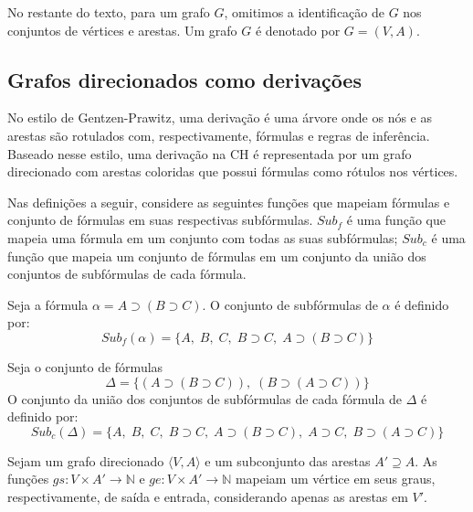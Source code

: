 No restante do texto, para um grafo $G$, omitimos a identificação de $G$ nos conjuntos de vértices e arestas. Um grafo $G$ é denotado por $G = (V, A)$. 

\subsection{Grafos direcionados como derivações}

No estilo de Gentzen-Prawitz, uma derivação é uma árvore onde os nós e as arestas são rotulados com, respectivamente, fórmulas e regras de inferência. Baseado nesse estilo, uma derivação na CH é representada por um grafo direcionado com arestas coloridas que possui fórmulas como  rótulos nos vértices.

Nas definições a seguir, considere as seguintes funções que mapeiam fórmulas e conjunto de fórmulas em suas respectivas subfórmulas. $Sub_f$ é uma função que mapeia uma fórmula em um conjunto com todas as suas subfórmulas; $Sub_c$ é uma função que mapeia um conjunto de fórmulas em um conjunto da união dos conjuntos de subfórmulas de cada fórmula.

\begin{example}
Seja a fórmula $\alpha = A \supset (B \supset C)$. O conjunto de subfórmulas de $\alpha$ é definido por: $$Sub_f(\alpha) = \{A,\; B,\; C,\; B\supset C,\; A \supset (B \supset C)\}$$
\end{example}

\begin{example}
Seja o conjunto de fórmulas $$\Delta = \{(A \supset (B \supset C)),\; (B \supset (A \supset C))\}$$ O conjunto da união dos conjuntos de subfórmulas de cada fórmula de $\Delta$ é definido por: $$Sub_c(\Delta) = \{A,\; B,\; C,\; B\supset C,\; A \supset (B \supset C),\; A \supset C,\; B \supset (A \supset C)\}$$
\end{example}

Sejam um grafo direcionado $\langle V, A\rangle$ e um subconjunto das arestas $A' \supseteq A$. As funções $gs: V \times A' \rightarrow \mathbb{N}$ e $ge: V \times A' \rightarrow \mathbb{N}$ mapeiam um vértice em seus graus, respectivamente, de saída e entrada, considerando apenas as arestas em $V'$.


